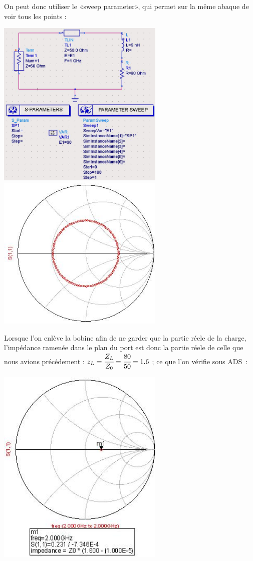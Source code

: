 \documentclass[10pt]{article}
\begin{document}
   On peut donc utiliser le «sweep parameter», qui permet sur la même abaque de voir tous les points :
   
   \includegraphics[width=8cm]{I2_d_circuit.jpg}
   \includegraphics[width=8cm]{I2_d_simulation.jpg}

   Lorsque l’on enlève la bobine afin de ne garder que la partie réele de la charge, l’impédance ramenée dans le plan du port est donc la partie réele de celle que nous avions précédement : $z_L=\cfrac{Z_L}{Z_0}=\cfrac{80}{50} = 1.6$ ; ce que l’on vérifie sous ADS :

   \includegraphics[width=8cm]{I2_e_impedance.jpg}
\end{document}
